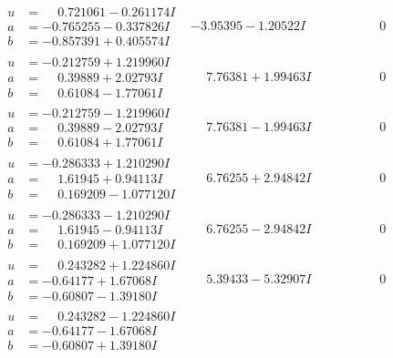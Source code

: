 \documentclass[1p]{elsarticle_modified}
\theoremstyle{definition}
\begin{document}
$$\begin{array}{c|c|c}
\begin{aligned}
u &= \phantom{-}0.721061 - 0.261174 I \\
a &= -0.765255 - 0.337826 I \\
b &= -0.857391 + 0.405574 I\end{aligned}
 & -3.95395 - 1.20522 I & \phantom{-0.000000 } 0 \\ \hline\begin{aligned}
u &= -0.212759 + 1.219960 I \\
a &= \phantom{-}0.39889 + 2.02793 I \\
b &= \phantom{-}0.61084 - 1.77061 I\end{aligned}
 & \phantom{-}7.76381 + 1.99463 I & \phantom{-0.000000 } 0 \\ \hline\begin{aligned}
u &= -0.212759 - 1.219960 I \\
a &= \phantom{-}0.39889 - 2.02793 I \\
b &= \phantom{-}0.61084 + 1.77061 I\end{aligned}
 & \phantom{-}7.76381 - 1.99463 I & \phantom{-0.000000 } 0 \\ \hline\begin{aligned}
u &= -0.286333 + 1.210290 I \\
a &= \phantom{-}1.61945 + 0.94113 I \\
b &= \phantom{-}0.169209 - 1.077120 I\end{aligned}
 & \phantom{-}6.76255 + 2.94842 I & \phantom{-0.000000 } 0 \\ \hline\begin{aligned}
u &= -0.286333 - 1.210290 I \\
a &= \phantom{-}1.61945 - 0.94113 I \\
b &= \phantom{-}0.169209 + 1.077120 I\end{aligned}
 & \phantom{-}6.76255 - 2.94842 I & \phantom{-0.000000 } 0 \\ \hline\begin{aligned}
u &= \phantom{-}0.243282 + 1.224860 I \\
a &= -0.64177 + 1.67068 I \\
b &= -0.60807 - 1.39180 I\end{aligned}
 & \phantom{-}5.39433 - 5.32907 I & \phantom{-0.000000 } 0 \\ \hline\begin{aligned}
u &= \phantom{-}0.243282 - 1.224860 I \\
a &= -0.64177 - 1.67068 I \\
b &= -0.60807 + 1.39180 I\end{aligned}

\end{array}$$
\end{document}

